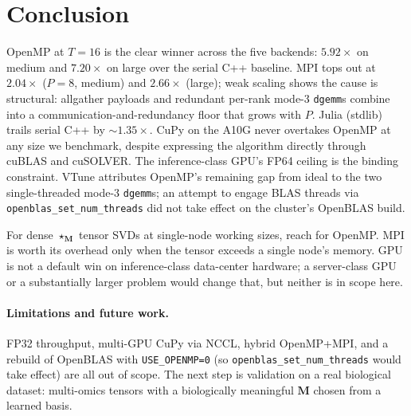 \documentclass{article}
\begin{document}
\section{Conclusion}
\label{sec:conclusion}
OpenMP at $T=16$ is the clear winner across the five backends:
$5.92\times$ on medium and $7.20\times$ on large over the serial
C++ baseline. MPI tops out at $2.04\times$ ($P=8$, medium) and
$2.66\times$ (large); weak scaling shows the cause is structural:
allgather payloads and redundant per-rank mode-3 \texttt{dgemm}s
combine into a communication-and-redundancy floor that grows with
$P$. Julia (stdlib) trails serial C++ by $\sim 1.35\times$. CuPy on
the A10G never overtakes OpenMP at any size we benchmark, despite
expressing the algorithm directly through cuBLAS and cuSOLVER. The
inference-class GPU's FP64 ceiling is the binding constraint. VTune
attributes OpenMP's remaining gap from ideal to the two
single-threaded mode-3 \texttt{dgemm}s; an attempt to engage BLAS
threads via \texttt{openblas\_set\_num\_threads} did not take effect
on the cluster's OpenBLAS build.

For dense $\star_{\mathbf{M}}$
tensor SVDs at single-node working sizes, reach for OpenMP. MPI is
worth its overhead only when the tensor exceeds a single node's
memory. GPU is not a default win on inference-class data-center
hardware; a server-class GPU or a substantially larger problem
would change that, but neither is in scope here.

\paragraph{Limitations and future work.} FP32 throughput, multi-GPU
CuPy via NCCL, hybrid OpenMP+MPI, and a rebuild of OpenBLAS with
\texttt{USE\_OPENMP=0} (so \texttt{openblas\_set\_num\_threads} would
take effect) are all out of scope. The next step is validation
on a real biological dataset: multi-omics tensors with a
biologically meaningful $\mathbf{M}$ chosen from a learned basis.





\end{document}
